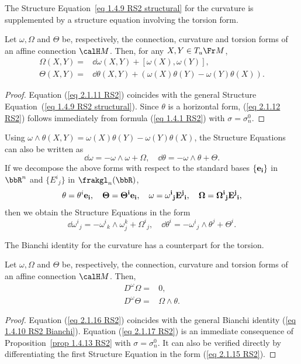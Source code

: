 The Structure Equation~\ref{eq 1.4.9 RS2 structural} for the curvature is supplemented by a structure equation involving the torsion form.

\begin{prop}\label{prop 2.1.11 RS2}
    Let $\omega,\Omega$ and $\Theta$ be, respectively, the connection, curvature and torsion forms of an affine connection $\calH M$. Then, for any $X,Y\in T_u \Fr M$,
    \begin{align}
        \Omega(X,Y)=& \dd\omega(X,Y)+[\omega(X),\omega(Y)],\label{eq 2.1.11 RS2}\\
        \Theta(X,Y)=& \dd\theta(X,Y)+(\omega(X)\theta(Y)-\omega(Y)\theta(X)).\label{eq 2.1.12 RS2}
    \end{align}
\end{prop}
\begin{proof}
    Equation (\ref{eq 2.1.11 RS2}) coincides with the general Structure Equation~(\ref{eq 1.4.9 RS2 structural}). Since $\theta$ is a horizontal form, (\ref{eq 2.1.12 RS2}) follows immediately from formula (\ref{eq 1.4.1 RS2}) with $\sigma=\sigma_n^0$.
\end{proof}

\begin{rem}
    Using $\omega\wedge\theta(X,Y)=\omega(X)\theta(Y)-\omega(Y)\theta(X)$, the Structure Equations can also be written as
    \[\dd\omega=-\omega\wedge\omega+\Omega,\quad \dd\theta=-\omega\wedge\theta+\Theta.\]
    If we decompose the above forms with respect to the standard bases $\{\bf{e}_i\}$ in $\bbR^n$ and $\{E^i{}_j\}$ in $\frakgl_n(\bbR)$,
    \[\theta=\theta^i\bf{e}_i,\quad \Theta=\Theta^i\bf{e}_i,\quad \omega=\omega^i{}_j E^j{}_i,\quad \Omega=\Omega^i{}_j E^j{}_i,\label{eq 2.1.14 RS2}\]
    then we obtain the Structure Equations in the form
    \[\dd\omega^i{}_j=-\omega^i{}_k\wedge \omega^k_j+\Omega^i{}_j,\quad \dd\theta^i=-\omega^i{}_j\wedge \theta^j+\Theta^i.\label{eq 2.1.15 RS2}\]
\end{rem}

The Bianchi identity for the curvature has a counterpart for the torsion.

\begin{prop}\label{prop 2.1.13 RS2}
    Let $\omega,\Omega$ and $\Theta$ be, respectively, the connection, curvature and torsion forms of an affine connection $\calH M$. Then,
    \begin{align}
        D^\omega\Omega=&0,\label{eq 2.1.16 RS2}\\
        D^\omega\Theta=&\Omega\wedge\theta.\label{eq 2.1.17 RS2}
    \end{align}
\end{prop}
\begin{proof}
    Equation (\ref{eq 2.1.16 RS2}) coincides with the general Bianchi identity (\ref{eq 1.4.10 RS2 Bianchi}). Equation (\ref{eq 2.1.17 RS2}) is an immediate consequence of Proposition~\ref{prop 1.4.13 RS2} with $\sigma=\sigma_n^0$. It can also be verified directly by differentiating the first Structure Equation in the form (\ref{eq 2.1.15 RS2}).
\end{proof}


